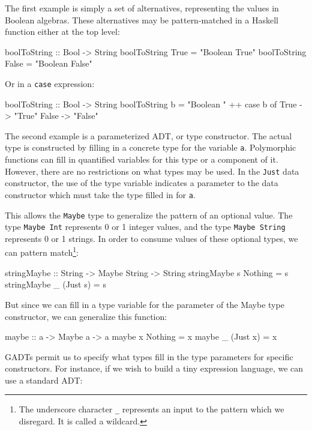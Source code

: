 The first example is simply a set of alternatives, representing the values in
Boolean algebras. These alternatives may be pattern-matched in a Haskell
function either at the top level:

\begin{code}
boolToString :: Bool -> String
boolToString True  = "Boolean True"
boolToString False = "Boolean False"
\end{code}

Or in a {\tt case} expression:

\begin{code}
boolToString :: Bool -> String
boolToString b = "Boolean " ++ case b of
                                 True  -> "True"
                                 False -> "False"
\end{code}

The second example is a parameterized ADT, or type constructor. The actual type
is constructed by filling in a concrete type for the variable {\tt a}.
Polymorphic functions can fill in quantified variables for this type or a
component of it. However, there are no restrictions on what types may be used.
In the {\tt Just} data constructor, the use of the type variable indicates a
parameter to the data constructor which must take the type filled in for {\tt a}.

This allows the {\tt Maybe} type to generalize the pattern of an optional value.
The type {\tt Maybe Int} represents 0 or 1 integer values, and the type
{\tt Maybe String} represents 0 or 1 strings. In order to consume values of these
optional types, we can pattern match\footnote{The underscore character {\tt\_} 
represents an input to the pattern which we disregard. It is called a wildcard.}:

\begin{code}
stringMaybe :: String -> Maybe String -> String
stringMaybe s Nothing = s
stringMaybe _ (Just s)  = s
\end{code}

But since we can fill in a type variable for the parameter of the Maybe type
constructor, we can generalize this function:

\begin{code}
maybe :: a -> Maybe a -> a
maybe x Nothing  = x
maybe _ (Just x) = x
\end{code}

GADTs permit us to specify what types fill in the type parameters for specific
constructors. For instance, if we wish to build a tiny expression language,
we can use a standard ADT:

